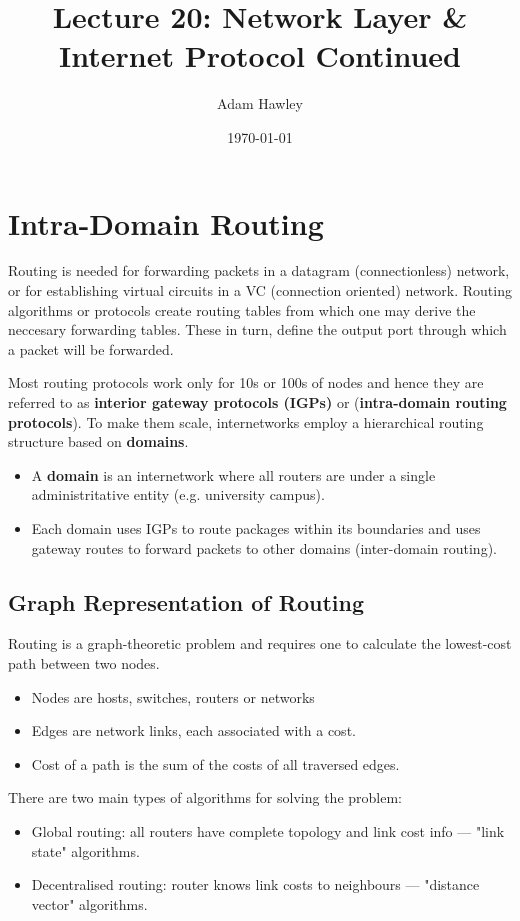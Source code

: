 \documentclass[11pt]{article}
\author{Adam Hawley}
\date{\today}
\title{Lecture 20: Network Layer \& Internet Protocol Continued}
\begin{document}
\maketitle
\tableofcontents


\section{Intra-Domain Routing}
\label{sec:orgc3bc4c0}
Routing is needed for forwarding packets in a datagram (connectionless) network, or for establishing virtual circuits in a VC (connection oriented) network.
Routing algorithms or protocols create routing tables from which one may derive the neccesary forwarding tables.
These in turn, define the output port through which a packet will be forwarded.

Most routing protocols work only for 10s or 100s of nodes and hence they are referred to as \textbf{interior gateway protocols (IGPs)} or (\textbf{intra-domain routing protocols}).
To make them scale, internetworks employ a hierarchical routing structure based on \textbf{domains}.
\begin{itemize}
\item A \textbf{domain} is an internetwork where all routers are under a single administritative entity (e.g. university campus).
\item Each domain uses IGPs to route packages within its boundaries and uses gateway routes to forward packets to other domains (inter-domain routing).
\end{itemize}

\subsection{Graph Representation of Routing}
\label{sec:org055c70c}
Routing is a graph-theoretic problem and requires one to calculate the lowest-cost path between two nodes.
\begin{itemize}
\item Nodes are hosts, switches, routers or networks
\item Edges are network links, each associated with a cost.
\item Cost of a path is the sum of the costs of all traversed edges.
\end{itemize}
There are two main types of algorithms for solving the problem:
\begin{itemize}
\item Global routing: all routers have complete topology and link cost info --- "link state" algorithms.
\item Decentralised routing: router knows link costs to neighbours --- "distance vector" algorithms.
\end{itemize}
\end{document}
